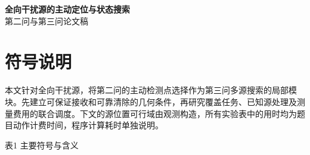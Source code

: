 \documentclass[UTF8,zihao=-4,fontset=fandol]{ctexart}
\begin{document}
\begin{center}
{\LARGE\bfseries 全向干扰源的主动定位与状态搜索}\\[7pt]
{\large 第二问与第三问论文稿}
\end{center}
\vspace{4pt}
\section{符号说明}\label{ux7b26ux53f7ux8bf4ux660e}

本文针对全向干扰源，将第二问的主动检测点选择作为第三问多源搜索的局部模块。先建立可保证接收和可靠清除的几何条件，再研究覆盖任务、已知源处理及测量费用的联合调度。下文的源位置可行域由观测构造，所有实验表中的用时均为题目动作计费时间，程序计算耗时单独说明。

\Needspace{38mm}
\begin{center}\small 表1 主要符号与含义\end{center}
\nopagebreak
\end{document}
